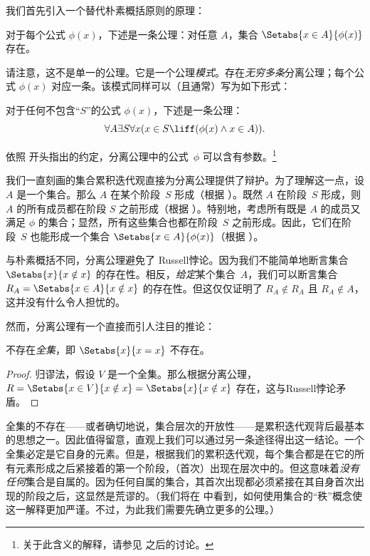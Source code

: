 \documentclass[../../../include/open-logic-section]{subfiles}
\begin{document}

我们首先引入一个替代朴素概括原则的原理：

\begin{axiom}[分离公理模式]
对于每个公式 $\phi(x)$，下述是一条公理：对任意 $A$，集合 $\Setabs{x \in A}{\phi(x)}$ 存在。
\end{axiom}

请注意，这不是单一的公理。它是一个公理\emph{模式}。存在\emph{无穷多条}分离公理；每个公式 $\phi(x)$ 对应一条。该模式同样可以（且通常）写为如下形式：

\begin{defish}
对于任何不包含“$S$”的公式 $\phi(x)$，下述是一条公理：
\[
	\forall A \exists S \forall x(x \in S \liff (\phi(x) \land x \in A)).
\]
\end{defish}

依照  开头指出的约定，分离公理中的公式~$\phi$ 可以含有参数。\footnote{关于此含义的解释，请参见  之后的讨论。}

我们一直刻画的集合累积迭代观直接为分离公理提供了辩护。为了理解这一点，设 $A$ 是一个集合。那么 $A$ 在某个阶段~$S$ 形成（根据 \stageshier）。既然 $A$ 在阶段~$S$ 形成，则 $A$ 的所有成员都在阶段 $S$ 之前形成（根据 \stagesacc）。特别地，考虑所有既是 $A$ 的成员又满足 $\phi$ 的集合；显然，所有这些集合也都在阶段~$S$ 之前形成。因此，它们在阶段~$S$ 也能形成一个集合 $\Setabs{x \in A}{\phi(x)}$（根据 \stagesacc）。

与朴素概括不同，分离公理避免了 Russell悖论。因为我们不能简单地断言集合 $\Setabs{x}{x \notin x}$ 的存在性。相反，\emph{给定}某个集合~$A$，我们可以断言集合 $R_A = \Setabs{x \in A}{x \notin x}$ 的存在性。但这仅仅证明了 $R_A \notin R_A$ 且 $R_A \notin A$，这并没有什么令人担忧的。

然而，分离公理有一个直接而引人注目的推论：

\begin{thm}
不存在\emph{全集}，即 $\Setabs{x}{x = x}$ 不存在。
\end{thm}

\begin{proof}
归谬法，假设 $V$ 是一个全集。那么根据分离公理，$R =
\Setabs{x \in V}{x \notin x} = \Setabs{x}{x \notin x}$ 存在，这与Russell悖论矛盾。
\end{proof}

全集的不存在——或者确切地说，集合层次的开放性——是累积迭代观背后最基本的思想之一。因此值得留意，直观上我们可以通过另一条途径得出这一结论。一个全集必定是它自身的元素。但是，根据我们的累积迭代观，每个集合都是在它的所有元素形成之后紧接着的第一个阶段，（首次）出现在层次中的。但这意味着\emph{没有任何}集合是自属的。因为任何自属的集合，其首次出现都必须紧接在其自身首次出现的阶段之后，这显然是荒谬的。（我们将在  中看到，如何使用集合的“秩”概念使这一解释更加严谨。不过，为此我们需要先确立更多的公理。）
\end{document}

